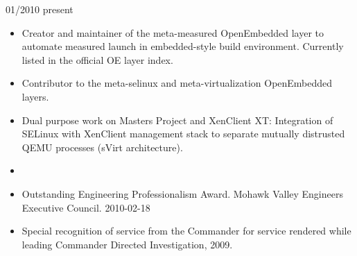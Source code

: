 \documentclass[letterpaper,11pt]{article}
\begin{document}
       {01/2010} {present}
      \begin {itemize}
        \setlength {\itemsep}{1pt}
        \setlength {\parskip}{0pt}
        \setlength {\parsep}{0pt}
      \item
        Creator and maintainer of the meta-measured OpenEmbedded layer to automate measured launch in embedded-style build environment.
        Currently listed in the official OE layer index.
      \item Contributor to the meta-selinux and meta-virtualization OpenEmbedded layers.
      \item
        Dual purpose work on Masters Project and XenClient XT:
        Integration of SELinux with XenClient management stack to separate mutually distrusted QEMU processes (sVirt architecture).
      \end {itemize}
      \pagebreak

    \begin{itemize}
    \item[]
    \end{itemize}

    \begin {itemize}
      \setlength {\itemsep}{1pt}
      \setlength {\parskip}{0pt}
      \setlength {\parsep}{0pt}
    \item Outstanding Engineering Professionalism Award.
      Mohawk Valley Engineers Executive Council.
      2010-02-18
    \item Special recognition of service from the Commander for service rendered while leading Commander Directed Investigation, 2009.
    \end {itemize}
\end{document}
